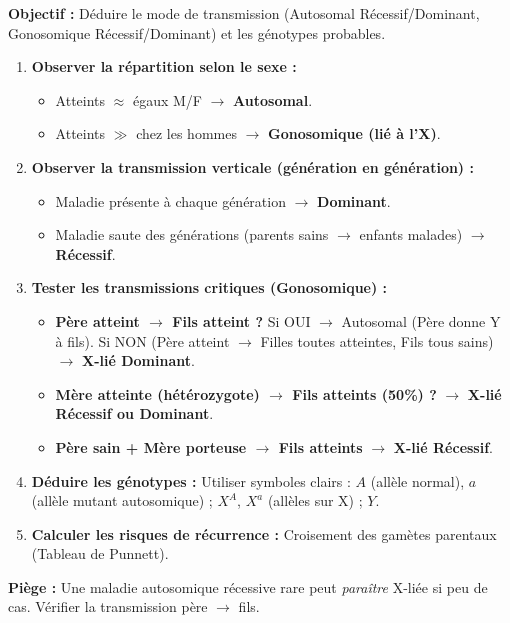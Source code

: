 \documentclass[11pt]{article}
\begin{document}
\begin{methode}
    \textbf{Objectif :} Déduire le mode de transmission (Autosomal Récessif/Dominant, Gonosomique Récessif/Dominant) et les génotypes probables.
    \begin{enumerate}
        \item \textbf{Observer la répartition selon le sexe :}
              \begin{itemize}
                  \item Atteints $\approx$ égaux M/F $\rightarrow$ \textbf{Autosomal}.
                  \item Atteints $\gg$ chez les hommes $\rightarrow$ \textbf{Gonosomique (lié à l'X)}.
              \end{itemize}
        \item \textbf{Observer la transmission verticale (génération en génération) :}
              \begin{itemize}
                  \item Maladie présente à chaque génération $\rightarrow$ \textbf{Dominant}.
                  \item Maladie saute des générations (parents sains $\rightarrow$ enfants malades) $\rightarrow$ \textbf{Récessif}.
              \end{itemize}
        \item \textbf{Tester les transmissions critiques (Gonosomique) :}
              \begin{itemize}
                  \item \textbf{Père atteint $\rightarrow$ Fils atteint ?} Si OUI $\rightarrow$ Autosomal (Père donne Y à fils). Si NON (Père atteint $\rightarrow$ Filles toutes atteintes, Fils tous sains) $\rightarrow$ \textbf{X-lié Dominant}.
                  \item \textbf{Mère atteinte (hétérozygote) $\rightarrow$ Fils atteints (50\%) ?} $\rightarrow$ \textbf{X-lié Récessif ou Dominant}.
                  \item \textbf{Père sain + Mère porteuse $\rightarrow$ Fils atteints} $\rightarrow$ \textbf{X-lié Récessif}.
              \end{itemize}
        \item \textbf{Déduire les génotypes :} Utiliser symboles clairs : $A$ (allèle normal), $a$ (allèle mutant autosomique) ; $X^A$, $X^a$ (allèles sur X) ; $Y$.
        \item \textbf{Calculer les risques de récurrence :} Croisement des gamètes parentaux (Tableau de Punnett).
    \end{enumerate}
    \textbf{Piège :} Une maladie autosomique récessive rare peut \emph{paraître} X-liée si peu de cas. Vérifier la transmission père $\rightarrow$ fils.
\end{methode}
\end{document}
